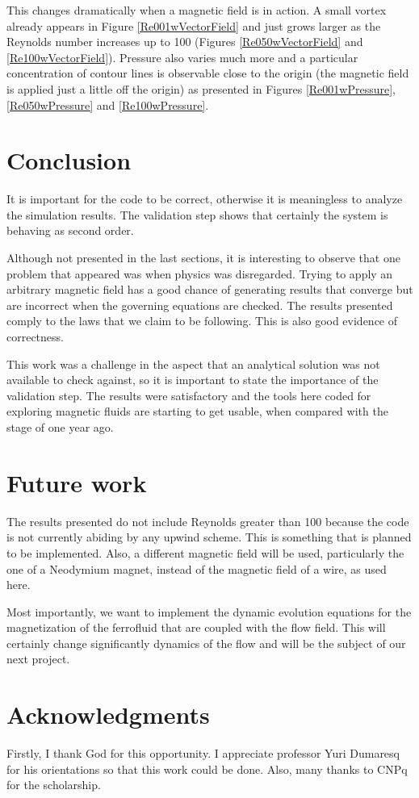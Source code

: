 \documentclass[journal]{IEEEtran}
\begin{document}
This changes dramatically when a magnetic field is in action. A small vortex already appears in Figure \ref{Re001wVectorField} and just grows larger as the Reynolds number increases up to 100 (Figures \ref{Re050wVectorField} and \ref{Re100wVectorField}). Pressure also varies much more and a particular concentration of contour lines is observable close to the origin (the magnetic field is applied just a little off the origin) as presented in Figures \ref{Re001wPressure}, \ref{Re050wPressure} and \ref{Re100wPressure}.


\section{Conclusion}

It is important for the code to be correct, otherwise it is meaningless to analyze the simulation results. The validation step shows that certainly the system is behaving as second order. 

Although not presented in the last sections, it is interesting to observe that one problem that appeared was when physics was disregarded. Trying to apply an arbitrary magnetic field has a good chance of generating results that converge but are incorrect when the governing equations are checked. The results presented comply to the laws that we claim to be following. This is also good evidence of correctness.

This work was a challenge in the aspect that an analytical solution was not available to check against, so it is important to state the importance of the validation step. The results were satisfactory and the tools here coded for exploring magnetic fluids are starting to get usable, when compared with the stage of one year ago.


\section{Future work}
The results presented do not include Reynolds greater than 100 because the code is not currently abiding by any upwind scheme. This is something that is planned to be implemented. Also, a different magnetic field will be used, particularly the one of a Neodymium magnet, instead of the magnetic field of a wire, as used here.

Most importantly, we want to implement the dynamic evolution equations for the magnetization of the ferrofluid that are coupled with the flow field. This will certainly change significantly dynamics of the flow and will be the subject of our next project.




\section*{Acknowledgments}

Firstly, I thank God for this opportunity. I appreciate professor Yuri Dumaresq for his orientations so that this work could be done. Also, many thanks to CNPq for the scholarship.




\end{document}
